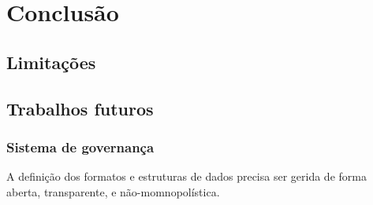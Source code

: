 \chapter{Conclusão}

\section{Limitações}



\section{Trabalhos futuros}

\subsection{Sistema de governança}

A definição dos formatos e estruturas de dados precisa ser gerida de forma aberta, transparente, e não-momnopolística.

\subsection{}
